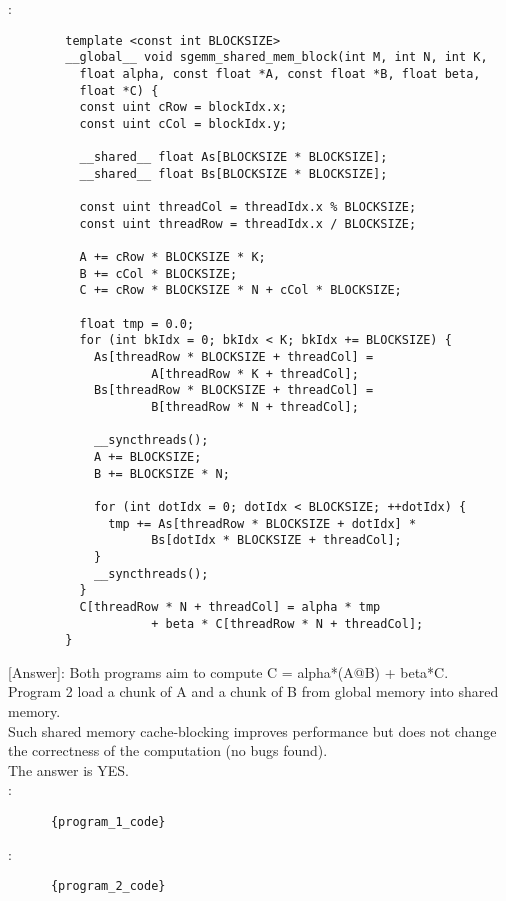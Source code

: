      \text{    [Program 2]}:\\
      \begin{lstlisting}
        template <const int BLOCKSIZE>
        __global__ void sgemm_shared_mem_block(int M, int N, int K,
          float alpha, const float *A, const float *B, float beta,
          float *C) {
          const uint cRow = blockIdx.x;
          const uint cCol = blockIdx.y;

          __shared__ float As[BLOCKSIZE * BLOCKSIZE];
          __shared__ float Bs[BLOCKSIZE * BLOCKSIZE];

          const uint threadCol = threadIdx.x % BLOCKSIZE;
          const uint threadRow = threadIdx.x / BLOCKSIZE;

          A += cRow * BLOCKSIZE * K;
          B += cCol * BLOCKSIZE;
          C += cRow * BLOCKSIZE * N + cCol * BLOCKSIZE;

          float tmp = 0.0;
          for (int bkIdx = 0; bkIdx < K; bkIdx += BLOCKSIZE) {
            As[threadRow * BLOCKSIZE + threadCol] =
                    A[threadRow * K + threadCol];
            Bs[threadRow * BLOCKSIZE + threadCol] =
                    B[threadRow * N + threadCol];

            __syncthreads();
            A += BLOCKSIZE;
            B += BLOCKSIZE * N;

            for (int dotIdx = 0; dotIdx < BLOCKSIZE; ++dotIdx) {
              tmp += As[threadRow * BLOCKSIZE + dotIdx] *
                    Bs[dotIdx * BLOCKSIZE + threadCol];
            }
            __syncthreads();
          }
          C[threadRow * N + threadCol] = alpha * tmp
                    + beta * C[threadRow * N + threadCol];
        }
      \end{lstlisting}
      [Answer]: Both programs aim to compute C = alpha*(A@B) + beta*C.\\
                Program 2 load a chunk of A and a chunk of B from global memory into shared memory.\\
                Such shared memory cache-blocking improves performance but does not change the correctness of the computation (no bugs found).\\
                The answer is YES.\\
      \text{    [Program 1]}:\\
      \begin{lstlisting}
      {program_1_code}
      \end{lstlisting}
      \text{    [Program 2]}:\\
      \begin{lstlisting}
      {program_2_code}
      \end{lstlisting}

